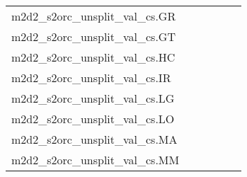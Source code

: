 {\begin{longtable}{m{6cm}m{1.7cm}m{1.7cm}m{1.7cm}m{1.7cm}m{1.7cm}}
	m2d2\_s2orc\_unsplit\_val\_cs.GR  & \colorbox[HTML]{b6e092}{\makebox[\mywidth][c]{13.45}} & \colorbox[HTML]{dbf1a4}{\makebox[\mywidth][c]{13.60}} & \colorbox[HTML]{ffffe5}{\makebox[\mywidth][c]{15.53}} & \colorbox[HTML]{ceeb9e}{\makebox[\mywidth][c]{13.54}} & \colorbox[HTML]{77c578}{\makebox[\mywidth][c]{13.29}}\\
	m2d2\_s2orc\_unsplit\_val\_cs.GT  & \colorbox[HTML]{77c578}{\makebox[\mywidth][c]{9.25}} & \colorbox[HTML]{e3f4aa}{\makebox[\mywidth][c]{9.59}} & \colorbox[HTML]{ffffe5}{\makebox[\mywidth][c]{11.34}} & \colorbox[HTML]{d0ec9e}{\makebox[\mywidth][c]{9.49}} & \colorbox[HTML]{8ccf81}{\makebox[\mywidth][c]{9.29}}\\
	m2d2\_s2orc\_unsplit\_val\_cs.HC  & \colorbox[HTML]{a0d789}{\makebox[\mywidth][c]{16.76}} & \colorbox[HTML]{d0ec9e}{\makebox[\mywidth][c]{16.93}} & \colorbox[HTML]{ffffe5}{\makebox[\mywidth][c]{19.08}} & \colorbox[HTML]{b8e293}{\makebox[\mywidth][c]{16.84}} & \colorbox[HTML]{77c578}{\makebox[\mywidth][c]{16.66}}\\
	m2d2\_s2orc\_unsplit\_val\_cs.IR  & \colorbox[HTML]{a4d98a}{\makebox[\mywidth][c]{13.30}} & \colorbox[HTML]{d5eea1}{\makebox[\mywidth][c]{13.46}} & \colorbox[HTML]{ffffe5}{\makebox[\mywidth][c]{15.26}} & \colorbox[HTML]{a9db8c}{\makebox[\mywidth][c]{13.31}} & \colorbox[HTML]{77c578}{\makebox[\mywidth][c]{13.21}}\\
	m2d2\_s2orc\_unsplit\_val\_cs.LG  & \colorbox[HTML]{b3df91}{\makebox[\mywidth][c]{10.39}} & \colorbox[HTML]{dcf1a5}{\makebox[\mywidth][c]{10.52}} & \colorbox[HTML]{ffffe5}{\makebox[\mywidth][c]{12.14}} & \colorbox[HTML]{c3e698}{\makebox[\mywidth][c]{10.44}} & \colorbox[HTML]{77c578}{\makebox[\mywidth][c]{10.27}}\\
	m2d2\_s2orc\_unsplit\_val\_cs.LO  & \colorbox[HTML]{77c578}{\makebox[\mywidth][c]{9.75}} & \colorbox[HTML]{e7f5ad}{\makebox[\mywidth][c]{10.23}} & \colorbox[HTML]{ffffe5}{\makebox[\mywidth][c]{12.50}} & \colorbox[HTML]{ccea9c}{\makebox[\mywidth][c]{10.03}} & \colorbox[HTML]{90d082}{\makebox[\mywidth][c]{9.81}}\\
	m2d2\_s2orc\_unsplit\_val\_cs.MA  & \colorbox[HTML]{87cc7f}{\makebox[\mywidth][c]{11.24}} & \colorbox[HTML]{e2f3a9}{\makebox[\mywidth][c]{11.65}} & \colorbox[HTML]{ffffe5}{\makebox[\mywidth][c]{14.10}} & \colorbox[HTML]{bae294}{\makebox[\mywidth][c]{11.41}} & \colorbox[HTML]{77c578}{\makebox[\mywidth][c]{11.19}}\\
	m2d2\_s2orc\_unsplit\_val\_cs.MM  & \colorbox[HTML]{a2d889}{\makebox[\mywidth][c]{13.12}} & \colorbox[HTML]{e5f4ab}{\makebox[\mywidth][c]{13.40}} & \colorbox[HTML]{ffffe5}{\makebox[\mywidth][c]{15.29}} & \colorbox[HTML]{c8e89a}{\makebox[\mywidth][c]{13.25}} & \colorbox[HTML]{77c578}{\makebox[\mywidth][c]{13.03}}\\

\end{longtable}}
